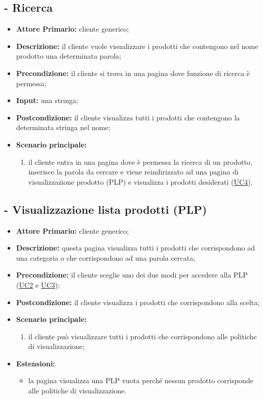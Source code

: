 \stepUserCase
\subsection{ - Ricerca}
\begin{itemize}
    \item \textbf{Attore Primario:} cliente generico;
    \item \textbf{Descrizione:} il cliente vuole visualizzare i prodotti che contengono nel nome prodotto una determinata parola;
    \item \textbf{Precondizione:} il cliente si trova in una pagina dove funzione di ricerca è permessa;
    \item \textbf{Input:} una stringa;
    \item \textbf{Postcondizione:} il cliente visualizza tutti i prodotti che contengono la determinata stringa nel nome;
    \item \textbf{Scenario principale:}
    \begin{enumerate}
        \item il cliente entra in una pagina dove è permessa la ricerca di un prodotto, inserisce la parola da cercare e viene reindirizzato ad una pagina di visualizzazione prodotto (PLP) e visualizza i prodotti desiderati (\hyperref[UC4]{UC4}).
    \end{enumerate}
\end{itemize}

\stepUserCase
\subsection{ - Visualizzazione lista prodotti (PLP)}
\begin{itemize}
    \item \textbf{Attore Primario:} cliente generico;
    \item \textbf{Descrizione:} questa pagina visualizza tutti i prodotti che corrispondono ad una categoria o che corrispondono ad una parola cercata;
    \item \textbf{Precondizione:} il cliente sceglie uno dei due modi per accedere alla PLP (\hyperref[UC2]{UC2} e \hyperref[UC3]{UC3});
    \item \textbf{Postcondizione:} il cliente visualizza i prodotti che corrispondono alla scelta;
    \item \textbf{Scenario principale:}
    \begin{enumerate}
        \item il cliente può visualizzare tutti i prodotti che corrispondono alle politiche di visualizzazione;
    \end{enumerate}
    \item \textbf{Estensioni:}
    \begin{itemize}
        \item la pagina visualizza una PLP vuota perché nessun prodotto corrisponde alle politiche di visualizzazione.
    \end{itemize}
\end{itemize}

